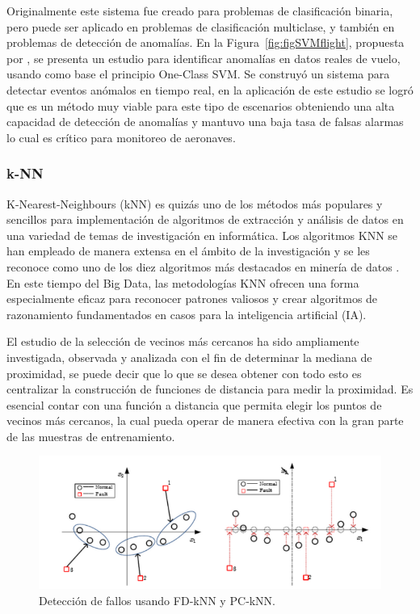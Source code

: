 \documentclass[11pt,a4paper,spanish]{book}
\numberwithin{equation}{chapter}
\numberwithin{figure}{chapter}
\begin{document}
Originalmente este sistema fue creado para problemas de clasificación binaria, pero 
puede ser aplicado en problemas de clasificación multiclase, y también en problemas de 
detección de anomalías. En la Figura~\ref{fig:figSVMflight}, propuesta por 
\cite{qin2022flight}, se presenta un estudio para identificar anomalías en datos reales 
de vuelo, usando como base el principio One-Class SVM. Se construyó un sistema para 
detectar eventos anómalos en tiempo real, en la aplicación de este estudio se logró que 
es un método muy viable para este tipo de escenarios obteniendo una alta capacidad de 
detección de anomalías y mantuvo una baja tasa de falsas alarmas lo cual es crítico para 
monitoreo de aeronaves.


\subsubsection{k-NN}


K-Nearest-Neighbours (kNN) es quizás uno de los métodos más populares y sencillos para 
implementación de algoritmos de extracción y análisis de datos en una variedad de temas 
de investigación en informática. Los algoritmos KNN se han empleado de manera extensa 
en el ámbito de la investigación y se les reconoce como uno de los diez algoritmos más 
destacados en minería de datos \cite{witten2005data}. En este tiempo del Big Data, 
las metodologías KNN ofrecen una forma especialmente eficaz para reconocer patrones 
valiosos y crear algoritmos de razonamiento fundamentados en casos para la inteligencia 
artificial (IA). \cite{wu2008top}


El estudio de la selección de vecinos más cercanos ha sido ampliamente investigada, 
observada y analizada con el fin de determinar la mediana de proximidad, se puede decir 
que lo que se desea obtener con todo esto es centralizar la construcción de funciones de 
distancia para medir la proximidad. Es esencial contar con una función a distancia que 
permita elegir los puntos de vecinos más cercanos, la cual pueda operar de manera 
efectiva con la gran parte de las muestras de entrenamiento. \cite{zhang2022influence}

\begin{figure}[h]
    \centering
    \includegraphics[width=1.0\textwidth]{media/knn-zhou.png}
    \caption{Detección de fallos usando FD‑kNN y PC‑kNN.  \protect\cite{zhou2015faultdetection} }
    \label{fig:figKnnZhou}
\end{figure}
\end{document}
